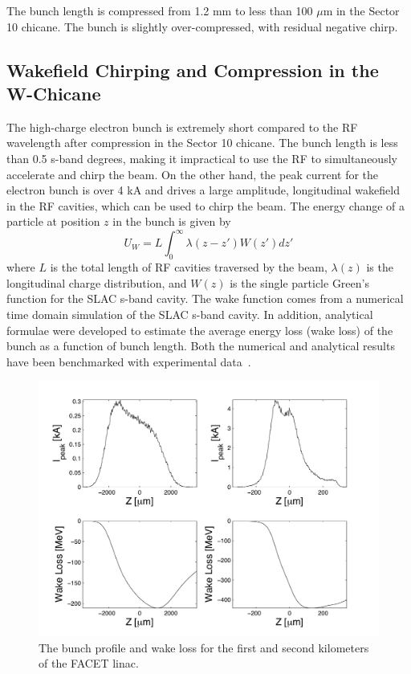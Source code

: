 \documentclass[%
twocolumn,
showpacs,preprintnumbers,
 aps,
prstab,
]{revtex4-1}
\begin{document}
The bunch length is compressed from 1.2 mm to less than 100 $\mu$m in the Sector 10 chicane. The bunch is slightly over-compressed, with residual negative chirp.

\subsection{Wakefield Chirping and Compression in the W-Chicane}\label{wakes}

The high-charge electron bunch is extremely short compared to the RF wavelength after compression in the Sector 10 chicane. The bunch length is less than 0.5 s-band degrees, making it impractical to use the RF to simultaneously accelerate and chirp the beam. On the other hand, the peak current for the electron bunch is over 4 kA and drives a large amplitude, longitudinal wakefield in the RF cavities, which can be used to chirp the beam. The energy change of a particle at position $z$ in the bunch is given by
\begin{equation}
U_W = L \int_0^\infty \lambda(z-z')W(z')dz'
\end{equation}
where $L$ is the total length of RF cavities traversed by the beam, $\lambda(z)$ is the longitudinal charge distribution, and $W(z)$ is the single particle Green's function for the SLAC s-band cavity. The wake function comes from a numerical time domain simulation of the SLAC s-band cavity. In addition, analytical formulae were developed to estimate the average energy loss (wake loss) of the bunch as a function of bunch length. Both the numerical and analytical results have been benchmarked with experimental data~\cite{sup_short}\cite{novo}.

\begin{figure}[hb]
  \includegraphics[width=\columnwidth]{figures/wakeloss.pdf}
  \caption{The bunch profile and wake loss for the first and second kilometers of the FACET linac.}
  \label{wake}
\end{figure}
\end{document}
